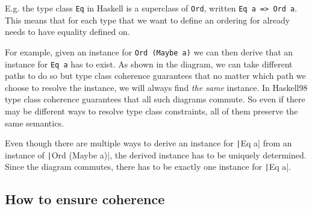 E.g. the type class \texttt{Eq} in Haskell is a superclass of \texttt{Ord}, written \texttt{Eq a => Ord a}.
This means that for each type that we want to define an ordering for already needs to have equality defined on.

For example, given an instance for \texttt{Ord (Maybe a)} we can then derive that an instance for \texttt{Eq a} has to exist.
As shown in the diagram, we can take different paths to do so but type class coherence guarantees that no matter which path we choose to resolve the instance, we will always find \emph{the same} instance.
In Haskell98 type class coherence guarantees that all such diagrams commute.
So even if there may be different ways to resolve type class constraints, all of them preserve the same semantics.


Even though there are multiple ways to derive an instance for \texttt|Eq a| from an instance of \texttt|Ord (Maybe a)|, the derived instance has to be uniquely determined.
Since the diagram commutes, there has to be exactly one instance for \texttt|Eq a|.

\subsection{How to ensure coherence}


